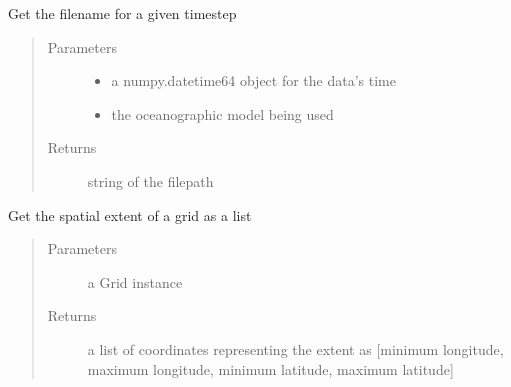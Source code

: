 \documentclass[letterpaper,10pt,english]{sphinxmanual}
\begin{document}
\begin{fulllineitems}
\label{\detokenize{octapy:octapy.tools.get_filepath}}
\sphinxAtStartPar
Get the filename for a given timestep
\begin{quote}\begin{description}
\item[{Parameters}] \leavevmode\begin{itemize}
\item {} 
\sphinxAtStartPar
{} \textendash{} a numpy.datetime64 object for the data’s time

\item {} 
\sphinxAtStartPar
{} \textendash{} the oceanographic model being used

\end{itemize}

\item[{Returns}] \leavevmode
\sphinxAtStartPar
string of the filepath

\end{description}\end{quote}

\end{fulllineitems}


\begin{fulllineitems}
\label{\detokenize{octapy:octapy.tools.get_extent}}
\sphinxAtStartPar
Get the spatial extent of a grid as a list
\begin{quote}\begin{description}
\item[{Parameters}] \leavevmode
\sphinxAtStartPar
{} \textendash{} a Grid instance

\item[{Returns}] \leavevmode
\sphinxAtStartPar
a list of coordinates representing the extent as {[}minimum longitude,
maximum longitude, minimum latitude, maximum latitude{]}

\end{description}\end{quote}

\end{fulllineitems}
\end{document}
